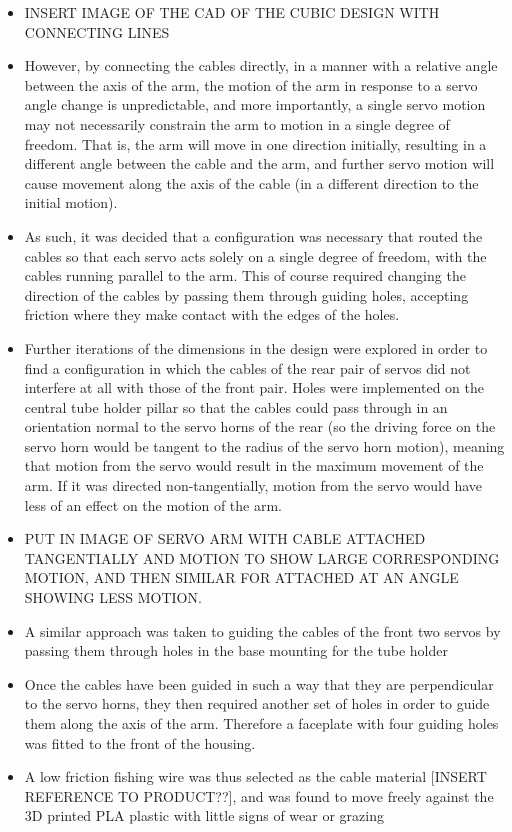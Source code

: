 \documentclass[11pt]{article}
\begin{document}
\begin{itemize}
\item{INSERT IMAGE OF THE CAD OF THE CUBIC DESIGN WITH CONNECTING LINES}
\item{However, by connecting the cables directly, in a manner with a relative angle between the axis of the arm, the motion of the arm in response to a servo angle change is unpredictable, and more importantly, a single servo motion may not necessarily constrain the arm to motion in a single degree of freedom. That is, the arm will move in one direction initially, resulting in a different angle between the cable and the arm, and further servo motion will cause movement along the axis of the cable (in a different direction to the initial motion). }
\item{As such, it was decided that a configuration was necessary that routed the cables so that each servo acts solely on a single degree of freedom, with the cables running parallel to the arm. This of course required changing the direction of the cables by passing them through guiding holes, accepting friction where they make contact with the edges of the holes.}
\item{Further iterations of the dimensions in the design were explored in order to find a configuration in which the cables of the rear pair of servos did not interfere at all with those of the front pair. Holes were implemented on the central tube holder pillar so that the cables could pass through in an orientation normal to the servo horns of the rear (so the driving force on the servo horn would be tangent to the radius  of the servo horn motion), meaning that motion from the servo would result in the maximum movement of the arm. If it was directed non-tangentially, motion from the servo would have less of an effect on the motion of the arm.} 
\item{PUT IN IMAGE OF SERVO ARM WITH CABLE ATTACHED TANGENTIALLY AND MOTION TO SHOW LARGE CORRESPONDING MOTION, AND THEN SIMILAR FOR ATTACHED AT AN ANGLE SHOWING LESS MOTION.}
\item{A similar approach was taken to guiding the cables of the front two servos by passing them through holes in the base mounting for the tube holder }
\item{Once the cables have been guided in such a way that they are perpendicular to the servo horns, they then required another set of holes in order to guide them along the axis of the arm. Therefore a faceplate with four guiding holes was fitted to the front of the housing.}
\item{A low friction fishing wire was thus selected as the cable material [INSERT REFERENCE TO PRODUCT??], and was found to move freely against the 3D printed PLA plastic with little signs of wear or grazing}

\end{itemize}
\end{document}
